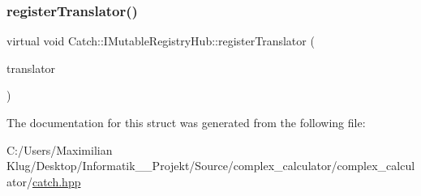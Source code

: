 \mbox{\label{struct_catch_1_1_i_mutable_registry_hub_ae6825365102693cf7707db022a2c2b49}} 
\subsubsection{\texorpdfstring{register\+Translator()}{registerTranslator()}}
{\footnotesize\ttfamily virtual void Catch\+::\+I\+Mutable\+Registry\+Hub\+::register\+Translator (\begin{DoxyParamCaption}\item[{const \mbox{\hyperlink{struct_catch_1_1_i_exception_translator}{I\+Exception\+Translator}} $\ast$}]{translator }\end{DoxyParamCaption})\hspace{0.3cm}{\ttfamily [pure virtual]}}



The documentation for this struct was generated from the following file\+:\begin{DoxyCompactItemize}
\item 
C\+:/\+Users/\+Maximilian Klug/\+Desktop/\+Informatik\+\_\+\_\+\+Projekt/\+Source/complex\+\_\+calculator/complex\+\_\+calculator/\mbox{\hyperlink{catch_8hpp}{catch.\+hpp}}\end{DoxyCompactItemize}
